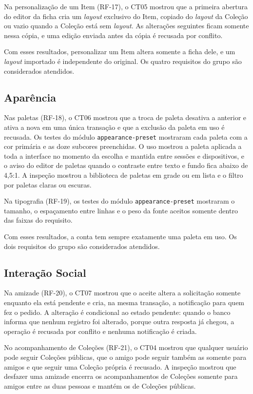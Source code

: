 Na personalização de um Item (RF-17), o CT05 mostrou que a primeira abertura do editor da ficha cria um \textit{layout} exclusivo do Item, copiado do \textit{layout} da Coleção
ou vazio quando a Coleção está sem \textit{layout}. As alterações seguintes ficam somente nessa cópia, e uma edição enviada antes da cópia é recusada por conflito.

Com esses resultados, personalizar um Item altera somente a ficha dele, e um \textit{layout} importado é independente do original. Os quatro requisitos
do grupo são considerados atendidos.

\subsection{Aparência}

Nas paletas (RF-18), o CT06 mostrou que a troca de paleta desativa a anterior e ativa a nova em uma única transação e que a exclusão da paleta em uso
é recusada. Os testes do módulo \texttt{appearance-preset} mostraram cada paleta com a cor primária e as doze subcores preenchidas. O uso mostrou a paleta
aplicada a toda a interface no momento da escolha e mantida entre sessões e dispositivos, e o aviso do editor de paletas quando o contraste entre texto e
fundo fica abaixo de 4,5:1. A inspeção mostrou a biblioteca de paletas em grade ou em lista e o filtro por paletas claras ou escuras.

Na tipografia (RF-19), os testes do módulo \texttt{appearance-preset} mostraram o tamanho, o espaçamento entre linhas e o peso da fonte aceitos somente
dentro das faixas do requisito.

Com esses resultados, a conta tem sempre exatamente uma paleta em uso. Os dois requisitos do grupo são considerados atendidos.

\subsection{Interação Social}

Na amizade (RF-20), o CT07 mostrou que o aceite altera a solicitação somente enquanto ela está pendente e cria, na mesma transação, a notificação para
quem fez o pedido. A alteração é condicional ao estado pendente: quando o banco informa que nenhum registro foi alterado, porque outra resposta já
chegou, a operação é recusada por conflito e nenhuma notificação é criada.

No acompanhamento de Coleções (RF-21), o CT04 mostrou que qualquer usuário pode seguir Coleções públicas, que o amigo pode seguir também as somente para
amigos e que seguir uma Coleção própria é recusado. A inspeção mostrou que desfazer uma amizade encerra os acompanhamentos de Coleções somente para
amigos entre as duas pessoas e mantém os de Coleções públicas.

